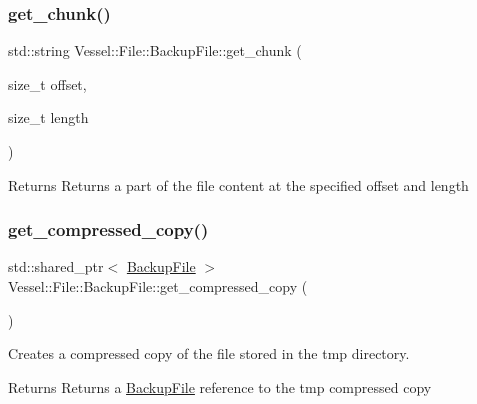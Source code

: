 \subsubsection{\texorpdfstring{get\+\_\+chunk()}{get\_chunk()}}
{\footnotesize\ttfamily std\+::string Vessel\+::\+File\+::\+Backup\+File\+::get\+\_\+chunk (\begin{DoxyParamCaption}\item[{size\+\_\+t}]{offset,  }\item[{size\+\_\+t}]{length }\end{DoxyParamCaption})}

\begin{DoxyReturn}{Returns}
Returns a part of the file content at the specified offset and length 
\end{DoxyReturn}
\mbox{\label{class_vessel_1_1_file_1_1_backup_file_a1ca4b7b8dbc8ea016662fdf1e58b309b}} 
\subsubsection{\texorpdfstring{get\+\_\+compressed\+\_\+copy()}{get\_compressed\_copy()}}
{\footnotesize\ttfamily std\+::shared\+\_\+ptr$<$ \hyperlink{class_vessel_1_1_file_1_1_backup_file}{Backup\+File} $>$ Vessel\+::\+File\+::\+Backup\+File\+::get\+\_\+compressed\+\_\+copy (\begin{DoxyParamCaption}{ }\end{DoxyParamCaption})}



Creates a compressed copy of the file stored in the tmp directory. 

\begin{DoxyReturn}{Returns}
Returns a \hyperlink{class_vessel_1_1_file_1_1_backup_file}{Backup\+File} reference to the tmp compressed copy 
\end{DoxyReturn}
\mbox{\label{class_vessel_1_1_file_1_1_backup_file_a720b6578b0c1fe64fb3edd391b006de9}} 
